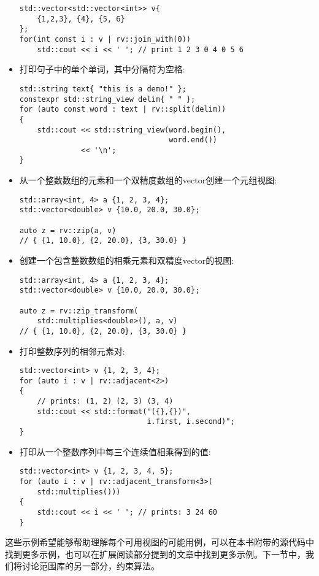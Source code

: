 \begin{itemize}
\begin{lstlisting}[style=styleCXX]
std::vector<std::vector<int>> v{
	{1,2,3}, {4}, {5, 6}
};
for(int const i : v | rv::join_with(0))
	std::cout << i << ' '; // print 1 2 3 0 4 0 5 6
\end{lstlisting}

\item
打印句子中的单个单词，其中分隔符为空格:

\begin{lstlisting}[style=styleCXX]
std::string text{ "this is a demo!" };
constexpr std::string_view delim{ " " };
for (auto const word : text | rv::split(delim))
{
	std::cout << std::string_view(word.begin(),
								  word.end())
			  << '\n';
}
\end{lstlisting}

\item
从一个整数数组的元素和一个双精度数组的vector创建一个元组视图:

\begin{lstlisting}[style=styleCXX]
std::array<int, 4> a {1, 2, 3, 4};
std::vector<double> v {10.0, 20.0, 30.0};

auto z = rv::zip(a, v)
// { {1, 10.0}, {2, 20.0}, {3, 30.0} }
\end{lstlisting}

\item
创建一个包含整数数组的相乘元素和双精度vector的视图:

\begin{lstlisting}[style=styleCXX]
std::array<int, 4> a {1, 2, 3, 4};
std::vector<double> v {10.0, 20.0, 30.0};

auto z = rv::zip_transform(
	std::multiplies<double>(), a, v)
// { {1, 10.0}, {2, 20.0}, {3, 30.0} }
\end{lstlisting}

\item
打印整数序列的相邻元素对:

\begin{lstlisting}[style=styleCXX]
std::vector<int> v {1, 2, 3, 4};
for (auto i : v | rv::adjacent<2>)
{
	// prints: (1, 2) (2, 3) (3, 4)
	std::cout << std::format("({},{})",
							 i.first, i.second)";
}
\end{lstlisting}

\item
打印从一个整数序列中每三个连续值相乘得到的值:

\begin{lstlisting}[style=styleCXX]
std::vector<int> v {1, 2, 3, 4, 5};
for (auto i : v | rv::adjacent_transform<3>(
	std::multiplies()))
{
	std::cout << i << ' '; // prints: 3 24 60
}
\end{lstlisting}

\end{itemize}

这些示例希望能够帮助理解每个可用视图的可能用例，可以在本书附带的源代码中找到更多示例，也可以在扩展阅读部分提到的文章中找到更多示例。下一节中，我们将讨论范围库的另一部分，约束算法。












